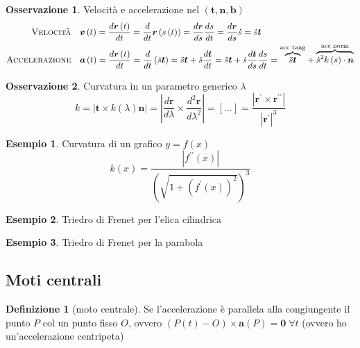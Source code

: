\documentclass[a4paper,10pt]{article}
\theoremstyle{definition}
\theoremstyle{indentdefinition}
\newtheorem{defn}{Definizione}[section]
\theoremstyle{indenttheorem}
\theoremstyle{myremark}
\newtheorem*{rem*}{Osservazione}
\newtheorem{example*}{Esempio}
\theoremstyle{indentgeneral}
\begin{document}
\begin{rem*}
Velocità e accelerazione nel  $\left(\boldsymbol{t},\boldsymbol{n},\boldsymbol{b}\right)$
\begin{align*}
\text{\textsc{Velocità}}\quad & \boldsymbol{v}\left(t\right)=\frac{d\boldsymbol{r}\left(t\right)}{dt}=\frac{d}{dt}\boldsymbol{r}\left(s\left(t\right)\right)=\frac{d\boldsymbol{r}}{ds}\frac{ds}{dt}=\frac{d\boldsymbol{r}}{ds}\dot{s}=\dot{s}\boldsymbol{t}\\
\text{\textsc{Accelerazione}}\quad & \boldsymbol{a}\left(t\right)=\frac{d\boldsymbol{r}\left(t\right)}{dt}=\frac{d}{dt}\left(\dot{s}\boldsymbol{t}\right)=\ddot{s}\boldsymbol{t}+\dot{s}\frac{d\boldsymbol{t}}{dt}=\ddot{s}\boldsymbol{t}+\dot{s}\frac{d\boldsymbol{t}}{ds}\frac{ds}{dt}=\overset{\text{acc tang}}{\overbrace{\ddot{s}\boldsymbol{t}}}+\overset{\text{acc norm}}{\overbrace{\dot{s}^{2}k\left(s\right)\cdot\boldsymbol{n}}}
\end{align*}
\end{rem*}
%
\begin{rem*}
Curvatura in un parametro generico $\lambda$
\[
k=\left|\boldsymbol{t}\times k\left(\lambda\right)\boldsymbol{n}\right|=\left|\frac{d\boldsymbol{r}}{d\lambda}\times\frac{d^{2}\boldsymbol{r}}{d\lambda^{2}}\right|=\left[\ldots\right]=\frac{\left|\boldsymbol{r}^{\prime}\times\boldsymbol{r}^{\prime\prime}\right|}{\left|\boldsymbol{r}^{\prime}\right|^{3}}
\]
\end{rem*}
\begin{example*}
Curvatura di un grafico $y=f\left(x\right)$
\[
k\left(x\right)=\frac{\left|f^{\prime\prime}\left(x\right)\right|}{\left(\sqrt{1+\left(f^{\prime}\left(x\right)\right)^{2}}\right)^{3}}
\]
\end{example*}
%
\begin{example*}
Triedro di Frenet per l'elica cilindrica
\end{example*}
%
\begin{example*}
Triedro di Frenet per la parabola
\end{example*}

\subsection{Moti centrali}
\begin{defn}[moto centrale]
\label{def:moto-centrale}Se l'accelerazione è parallela alla congiungente
il punto $P$ col un punto fisso $O$, ovvero $\left(P(t)-O\right)\times\boldsymbol{a}(P)=\boldsymbol{0} \; \forall t$ (ovvero ho un'accelerazione centripeta)
\end{defn}
\end{document}

